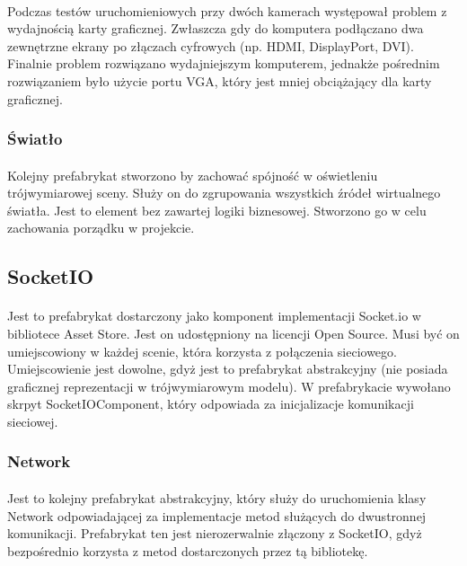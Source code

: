 \paragraph{}
Podczas testów uruchomieniowych przy dwóch kamerach występował problem z wydajnością karty graficznej. Zwłaszcza gdy do komputera podłączano dwa zewnętrzne ekrany po złączach cyfrowych (np. HDMI, DisplayPort, DVI). Finalnie problem rozwiązano wydajniejszym komputerem, jednakże pośrednim rozwiązaniem było użycie portu VGA, który jest mniej obciążający dla karty graficznej.

\subsubsection{Światło}
\paragraph{}
Kolejny prefabrykat stworzono by zachować spójność w oświetleniu trójwymiarowej sceny. Służy on do zgrupowania wszystkich źródeł wirtualnego światła. Jest to element bez zawartej logiki biznesowej. Stworzono go w celu zachowania porządku w projekcie.


\subsection{SocketIO}
\paragraph{}
Jest to prefabrykat dostarczony jako komponent implementacji Socket.io w bibliotece Asset Store. Jest on udostępniony na licencji Open Source.  Musi być on umiejscowiony w każdej scenie, która korzysta z połączenia sieciowego. Umiejscowienie jest dowolne, gdyż jest to prefabrykat abstrakcyjny (nie posiada graficznej reprezentacji w trójwymiarowym modelu). W prefabrykacie wywołano skrpyt SocketIOComponent, który odpowiada za inicjalizacje komunikacji sieciowej.

\subsubsection{Network}
\paragraph{}
Jest to kolejny prefabrykat abstrakcyjny, który służy do uruchomienia klasy Network odpowiadającej za implementacje metod służących do dwustronnej komunikacji.
Prefabrykat ten jest nierozerwalnie złączony z SocketIO, gdyż bezpośrednio korzysta z metod dostarczonych przez tą bibliotekę.


